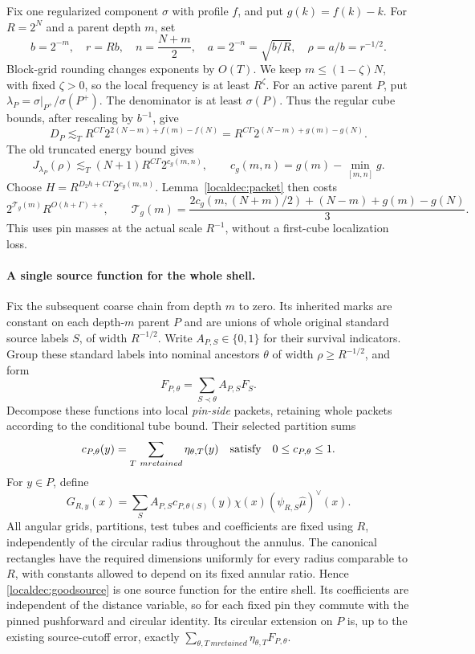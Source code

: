 Fix one regularized component \(\sigma\) with profile \(f\), and put
\(g(k)=f(k)-k\). For \(R=2^N\) and a parent depth \(m\), set
\[
 b=2^{-m},\quad r=Rb,\quad n=\frac{N+m}{2},\quad
 a=2^{-n}=\sqrt{b/R},\quad \rho=a/b=r^{-1/2}.
\]
Block-grid rounding changes exponents by \(O(T)\). We keep
\(m\le(1-\zeta)N\), with fixed \(\zeta>0\), so the local frequency
is at least \(R^\zeta\). For an active parent \(P\), put
\(\lambda_P=\sigma|_{P^+}/\sigma(P^+)\).
The denominator is at least \(\sigma(P)\). Thus the regular cube
bounds, after rescaling by \(b^{-1}\), give
\begin{equation}\label{localdec:density}
 D_P\lesssim_T R^{C\Gamma}2^{2(N-m)+f(m)-f(N)}
       =R^{C\Gamma}2^{(N-m)+g(m)-g(N)}.
\end{equation}
The old truncated energy bound gives
\[
 J_{\lambda_P}(\rho)\lesssim_T (N+1)R^{C\Gamma}2^{c_g(m,n)},
 \qquad c_g(m,n)=g(m)-\min_{[m,n]}g.
\]
Choose \(H=R^{D_2h+C\Gamma}2^{c_g(m,n)}\).
Lemma~\ref{localdec:packet} then costs
\begin{equation}\label{localdec:terminalcost}
 2^{\mathcal T_g(m)}R^{O(h+\Gamma)+\varepsilon},\qquad
 \mathcal T_g(m)=
 \frac{2c_g(m,(N+m)/2)+(N-m)+g(m)-g(N)}3.
\end{equation}
This uses pin masses at the actual scale \(R^{-1}\), without a
first-cube localization loss.

\paragraph{A single source function for the whole shell.}
Fix the subsequent coarse chain from depth \(m\) to zero. Its inherited
marks are constant on each depth-\(m\) parent \(P\) and are unions of
whole original standard source labels \(S\), of width \(R^{-1/2}\).
Write \(A_{P,S}\in\{0,1\}\) for their survival indicators. Group
these standard labels into nominal ancestors \(\theta\) of width
\(\rho\ge R^{-1/2}\), and form
\[
 F_{P,\theta}=\sum_{S\prec\theta}A_{P,S}F_S.
\]
Decompose these functions into local \emph{pin-side} packets, retaining
whole packets according to the conditional tube bound. Their selected
partition sums
\[
 c_{P,\theta}(y)=\sum_{T\ {
m retained}}\eta_{\theta,T}(y)
 \quad\hbox{satisfy}\quad 0\le c_{P,\theta}\le1.
\]
For \(y\in P\), define
\begin{equation}\label{localdec:goodsource}
 G_{R,y}(x)=\sum_S A_{P,S}c_{P,\theta(S)}(y)
       \chi(x)(\psi_{R,S}\widehat\mu)^\vee(x).
\end{equation}
All angular grids, partitions, test tubes and coefficients are fixed
using \(R\), independently of the circular radius throughout the
annulus. The canonical rectangles have the required dimensions
uniformly for every radius comparable to \(R\), with constants
allowed to depend on its fixed annular ratio. Hence
\eqref{localdec:goodsource} is one source function for the entire shell.
Its coefficients are independent of the distance variable, so for
each fixed pin they commute with the pinned pushforward and circular
identity. Its circular extension on \(P\) is, up to the existing
source-cutoff error, exactly
\(\sum_{\theta,T\ {
m retained}}\eta_{\theta,T}F_{P,\theta}\).

